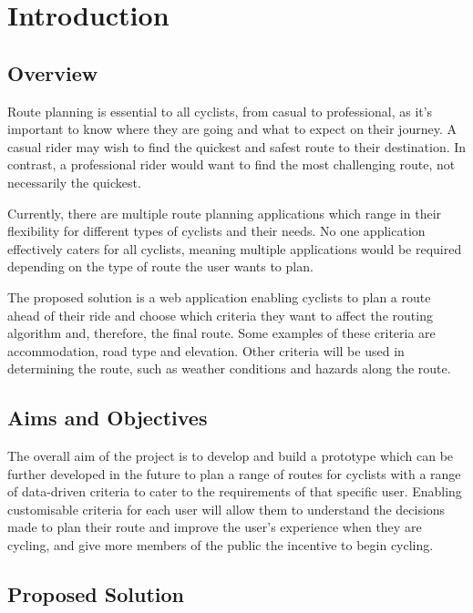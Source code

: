 \chapter{Introduction}
\label{chap:intro}

\section{Overview}
\label{intro:overview}

Route planning is essential to all cyclists, from casual to professional, as it's important to know where they are going and what to expect on their journey. A casual rider may wish to find the quickest and safest route to their destination. In contrast, a professional rider would want to find the most challenging route, not necessarily the quickest.

Currently, there are multiple route planning applications which range in their flexibility for different types of cyclists and their needs. No one application effectively caters for all cyclists, meaning multiple applications would be required depending on the type of route the user wants to plan.

The proposed solution is a web application enabling cyclists to plan a route ahead of their ride and choose which criteria they want to affect the routing algorithm and, therefore, the final route. Some examples of these criteria are accommodation, road type and elevation. Other criteria will be used in determining the route, such as weather conditions and hazards along the route.

\section{Aims and Objectives}
\label{intro:aimsandobjectives}

The overall aim of the project is to develop and build a prototype which can be further developed in the future to plan a range of routes for cyclists with a range of data-driven criteria to cater to the requirements of that specific user. Enabling customisable criteria for each user will allow them to understand the decisions made to plan their route and improve the user's experience when they are cycling, and give more members of the public the incentive to begin cycling.

\section{Proposed Solution}
\label{intro:proposedsolution}

